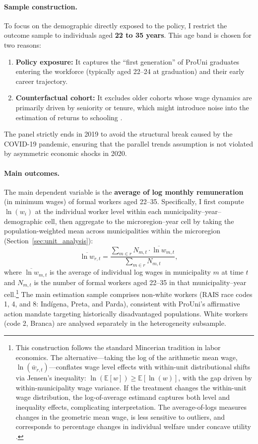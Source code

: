 \paragraph{Sample construction.}
To focus on the demographic directly exposed to the policy, I restrict the outcome sample to individuals aged \textbf{22 to 35 years}. This age band is chosen for two reasons:
\begin{enumerate}
    \item \textbf{Policy exposure:} It captures the ``first generation'' of ProUni graduates entering the workforce (typically aged 22--24 at graduation) and their early career trajectory.
    \item \textbf{Counterfactual cohort:} It excludes older cohorts whose wage dynamics are primarily driven by seniority or tenure, which might introduce noise into the estimation of returns to schooling \cite{Card1999, AngristPischke2009}.
\end{enumerate}
The panel strictly ends in 2019 to avoid the structural break caused by the COVID-19 pandemic, ensuring that the parallel trends assumption is not violated by asymmetric economic shocks in 2020.

\paragraph{Main outcomes.}
The main dependent variable is the \textbf{average of log monthly remuneration} (in minimum wages) of formal workers aged 22--35. Specifically, I first compute $\ln(w_i)$ at the individual worker level within each municipality--year--demographic cell, then aggregate to the microregion--year cell by taking the population-weighted mean across municipalities within the microregion (Section~\ref{sec:unit_analysis}):
\begin{equation}
    \overline{\ln w}_{r,t} = \frac{\sum_{m \in r} N_{m,t} \cdot \overline{\ln w}_{m,t}}{\sum_{m \in r} N_{m,t}},
    \label{eq:outcome_variable}
\end{equation}
where $\overline{\ln w}_{m,t}$ is the average of individual log wages in municipality $m$ at time $t$ and $N_{m,t}$ is the number of formal workers aged 22--35 in that municipality--year cell.\footnote{This construction follows the standard Mincerian tradition in labor economics. The alternative---taking the log of the arithmetic mean wage, $\ln(\bar{w}_{r,t})$---conflates wage level effects with within-unit distributional shifts via Jensen's inequality: $\ln(\mathbb{E}[w]) \geq \mathbb{E}[\ln(w)]$, with the gap driven by within-municipality wage variance. If the treatment changes the within-unit wage distribution, the log-of-average estimand captures both level and inequality effects, complicating interpretation. The average-of-logs measures changes in the geometric mean wage, is less sensitive to outliers, and corresponds to percentage changes in individual welfare under concave utility \cite{Card1999}.} The main estimation sample comprises non-white workers (RAIS race codes 1, 4, and 8: Ind\'{i}gena, Preta, and Parda), consistent with ProUni's affirmative action mandate targeting historically disadvantaged populations. White workers (code 2, Branca) are analysed separately in the heterogeneity subsample.

